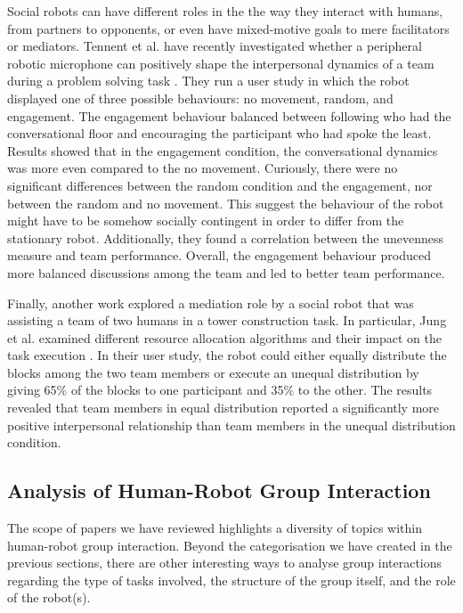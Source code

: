 Social robots can have different roles in the the way they interact with humans, from partners to opponents, or even have mixed-motive goals to mere facilitators or mediators. Tennent et al. have recently investigated whether a peripheral robotic microphone can positively shape the interpersonal dynamics of a team during a problem solving task \cite{tennent2019micbot}. They run a user study in which the robot displayed one of three possible behaviours: no movement, random, and engagement. The engagement behaviour balanced between following who had the conversational floor and encouraging the participant who had spoke the least. Results showed that in the engagement condition, the conversational dynamics was more even compared to the no movement. Curiously, there were no significant differences between the random condition and the engagement, nor between the random and no movement. This suggest the behaviour of the robot might have to be somehow socially contingent in order to differ from the stationary robot. Additionally, they found a correlation between the unevenness measure and team performance. Overall, the engagement behaviour produced more balanced discussions among the team and led to better team performance.

Finally, another work explored a mediation role by a social robot that was assisting a team of two humans in a tower construction task. In particular, Jung et al. examined different resource allocation algorithms and their impact on the task execution \cite{jung2018robot}. In their user study, the robot could either equally distribute the blocks among the two team members or execute an unequal distribution by giving 65\% of the blocks to one participant and 35\% to the other. The results revealed that team members in equal distribution reported a significantly more positive interpersonal relationship than team members in the unequal distribution condition.



\subsection{Analysis of Human-Robot Group Interaction}
The scope of papers we have reviewed highlights a diversity of topics within human-robot group interaction. Beyond the categorisation we have created in the previous sections, there are other interesting ways to analyse group interactions regarding the type of tasks involved, the structure of the group itself, and the role of the robot(s).

